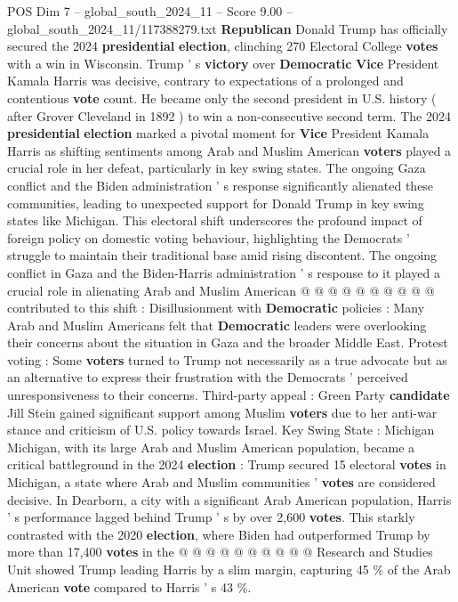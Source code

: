 \begin{textsample}{POS Dim 7 – global\_south\_2024\_11 – Score 9.00 – global\_south\_2024\_11/117388279.txt}  \label{ex:f7_pos_145}
\textbf{Republican} Donald Trump has officially secured the 2024 \textbf{presidential} \textbf{election}, clinching 270 Electoral College \textbf{votes} with a win in Wisconsin.
Trump ' s \textbf{victory} over \textbf{Democratic} \textbf{Vice} President Kamala Harris was decisive, contrary to expectations of a prolonged and contentious \textbf{vote} count.
He became only the second president in U.S. history ( after Grover Cleveland in 1892 ) to win a non-consecutive second term.
The 2024 \textbf{presidential} \textbf{election} marked a pivotal moment for \textbf{Vice} President Kamala Harris as shifting sentiments among Arab and Muslim American \textbf{voters} played a crucial role in her defeat, particularly in key swing states.
The ongoing Gaza conflict and the Biden administration ' s response significantly alienated these communities, leading to unexpected support for Donald Trump in key swing states like Michigan.
This electoral shift underscores the profound impact of foreign policy on domestic voting behaviour, highlighting the Democrats ' struggle to maintain their traditional base amid rising discontent.
The ongoing conflict in Gaza and the Biden-Harris administration ' s response to it played a crucial role in alienating Arab and Muslim American @ @ @ @ @ @ @ @ @ @ contributed to this shift : Disillusionment with \textbf{Democratic} policies : Many Arab and Muslim Americans felt that \textbf{Democratic} leaders were overlooking their concerns about the situation in Gaza and the broader Middle East.
Protest voting : Some \textbf{voters} turned to Trump not necessarily as a true advocate but as an alternative to express their frustration with the Democrats ' perceived unresponsiveness to their concerns.
Third-party appeal : Green Party \textbf{candidate} Jill Stein gained significant support among Muslim \textbf{voters} due to her anti-war stance and criticism of U.S. policy towards Israel.
Key Swing State : Michigan Michigan, with its large Arab and Muslim American population, became a critical battleground in the 2024 \textbf{election} : Trump secured 15 electoral \textbf{votes} in Michigan, a state where Arab and Muslim communities ' \textbf{votes} are considered decisive.
In Dearborn, a city with a significant Arab American population, Harris ' s performance lagged behind Trump ' s by over 2,600 \textbf{votes}.
This starkly contrasted with the 2020 \textbf{election}, where Biden had outperformed Trump by more than 17,400 \textbf{votes} in the @ @ @ @ @ @ @ @ @ @ Research and Studies Unit showed Trump leading Harris by a slim margin, capturing 45 \% of the Arab American \textbf{vote} compared to Harris ' s 43 \%.

\end{textsample}

